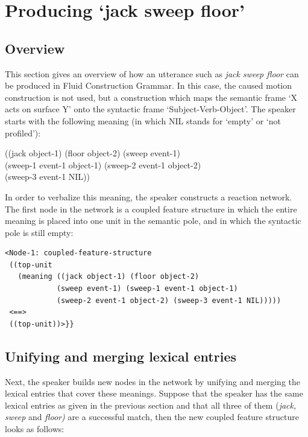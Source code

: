 \section{Producing `jack sweep floor'}

\subsection{Overview}
This section gives an overview of how an utterance such as {\em jack sweep floor} can be produced in Fluid Construction Grammar. In this case, the caused motion construction is not used, but a construction which maps the semantic frame `X acts on surface Y' onto the syntactic frame `Subject-Verb-Object'. The speaker starts with the following meaning (in which NIL stands for `empty' or `not profiled'):

\ea
((jack object-1) (floor object-2) (sweep event-1) 
\\ \hspace*{3mm}(sweep-1 event-1 object-1) (sweep-2 event-1 object-2) 
\\ \hspace*{3mm}(sweep-3 event-1 NIL))
\z

In order to verbalize this meaning, the speaker constructs a reaction network. The first node in the network is a coupled feature structure in which the entire meaning is placed into one unit in the semantic pole, and in which the syntactic pole is still empty:


\ea
\begin{lstlisting}
<Node-1: coupled-feature-structure
 ((top-unit
   (meaning ((jack object-1) (floor object-2)
            (sweep event-1) (sweep-1 event-1 object-1)
            (sweep-2 event-1 object-2) (sweep-3 event-1 NIL)))))
 <==>
 ((top-unit))>}}

\end{lstlisting}
\z
\subsection{Unifying and merging lexical entries}

Next, the speaker builds new nodes in the network by unifying and merging the lexical entries that cover these meanings. Suppose that the speaker has the same lexical entries as given in the previous section and that all three of them ({\em jack, sweep} and {\em floor)} are a successful match, then the new coupled feature structure looks as follows:


